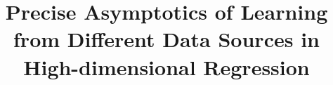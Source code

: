\documentclass{article}
\newcommand*\samethanks[1][\value{footnote}]{\footnotemark[#1]}
\begin{document}
	\title{Precise Asymptotics of Learning from Different Data Sources in High-dimensional Regression}
	\iffalse
	\vspace{0.15in}
	\author[1]{Hongyang R. Zhang\thanks{HZ and FY contributed equally to the theoretical results. SW conducted the experimental analysis. Correspondence to hrzhang@northeastern.edu or fyang75@wharton.upenn.edu.}}
	\author[2]{Fan Yang\samethanks}
	\author[3]{Sen Wu\samethanks}
	\author[2]{Weijie J. Su}
	\author[3]{Christopher R\'e}
	\vspace{0.15in}
	\affil[1]{Khoury College of Computer Sciences, Northeastern University}
	\affil[2]{Department of Statistics, The Wharton School, University of Pennsylvania}
	\affil[3]{Department of Computer Science, Stanford University}
	\fi

	\maketitle
	
	
	
	
	
	
	
	
\end{document}
